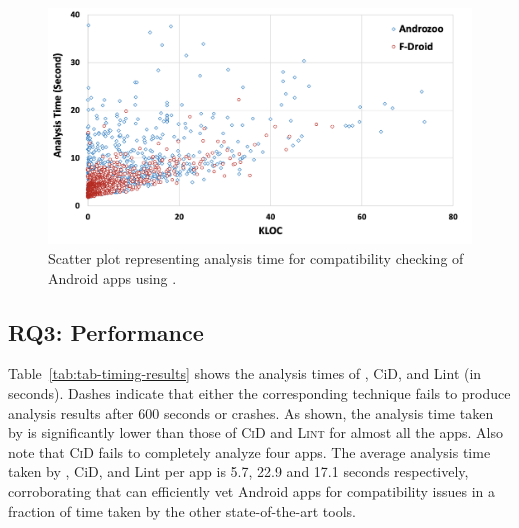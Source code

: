 \begin{figure}[b]
    \centering
    \includegraphics[width=\linewidth]{images/scatterplot.png}
    \caption{Scatter plot representing analysis time for compatibility checking of Android apps using \@approach.}
    \label{fig:scatterplot}
\end{figure}


\subsection{RQ3: Performance} %

Table~\ref{tab:tab-timing-results} shows the analysis times
of \@approach, {\sc CiD}, and {\sc Lint} (in seconds).
Dashes indicate that either the corresponding technique fails to produce analysis
results after 600 seconds or crashes.
As shown, the analysis time taken by \@approach is
significantly lower than those of \textsc{CiD} and
\textsc{Lint} for almost all the apps. Also note that
\textsc{CiD} fails to completely analyze four apps. %
The average analysis time taken by
\@approach, {\sc CiD}, and {\sc Lint} per app is 5.7, 22.9
and 17.1 seconds respectively, corroborating that \@approach
can efficiently vet Android apps for compatibility issues in
a fraction of time taken by the other state-of-the-art
tools.




